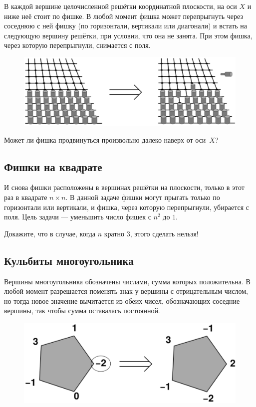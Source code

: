 В каждой вершине целочисленной решётки координатной плоскости, на оси $X$ и ниже неё стоит по фишке.
В любой момент фишка может перепрыгнуть через соседнюю с ней фишку (по горизонтали, вертикали или диагонали) и встать на следующую вершину решётки, при условии, что она не занята.
При этом фишка, через которую перепрыгнули, снимается с поля.

\begin{figure}[h!]
\centering
\includegraphics[scale=0.6]{Figs/Algorithms/pegs}
\end{figure}

Может ли фишка продвинуться произвольно далеко наверх от оси~$X$?

\subsection*{Фишки на квадрате}%

И снова фишки расположены в вершинах решётки на плоскости, только в этот раз в квадрате $n\times n$.
В данной задаче фишки могут прыгать только по горизонтали или вертикали, и фишка, через которую перепрыгнули, убирается с поля.
Цель задачи --- уменьшить число фишек с $n^2$ до $1$.

Докажите, что в случае, когда $n$ кратно $3$, этого сделать нельзя!

\subsection*{Кульбиты многоугольника}%

Вершины многоугольника обозначены числами, сумма которых положительна.
В любой момент разрешается поменять знак у вершины с отрицательным числом, но тогда новое значение вычитается из обеих чисел, обозначающих соседние вершины, так чтобы сумма оставалась постоянной.

\begin{figure}[h!]
\centering
\includegraphics[scale=0.6]{Figs/Algorithms/pent}
\end{figure}

